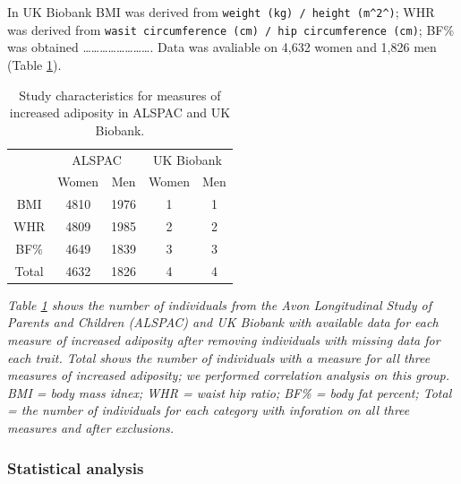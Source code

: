 \documentclass[11pt,twoside]{bristolthesis}
\begin{document}
In UK Biobank BMI was derived from \texttt{weight\ (kg)\ /\ height\ (m\^{}2\^{})}; WHR was derived from \texttt{wasit\ circumference\ (cm)\ /\ hip\ circumference\ (cm)}; BF\% was obtained \ldots{}\ldots{}\ldots{}\ldots{}\ldots{}\ldots{}\ldots{}\ldots{}. Data was avaliable on 4,632 women and 1,826 men (Table \ref{tab:study-characteristics}).
\begin{longtable}[t]{ccccc}
\caption{\label{tab:study-characteristics}Study characteristics for measures of increased adiposity in ALSPAC and UK Biobank.}\\
\toprule
\multicolumn{1}{c}{ } & \multicolumn{2}{c}{ALSPAC} & \multicolumn{2}{c}{UK Biobank} \\
\cmidrule(l{3pt}r{3pt}){2-3} \cmidrule(l{3pt}r{3pt}){4-5}
 & Women & Men & Women & Men\\
\midrule
BMI & 4810 & 1976 & 1 & 1\\
WHR & 4809 & 1985 & 2 & 2\\
BF\% & 4649 & 1839 & 3 & 3\\
Total & 4632 & 1826 & 4 & 4\\
\bottomrule
\end{longtable}
\noindent
\emph{Table \ref{tab:study-characteristics} shows the number of individuals from the Avon Longitudinal Study of Parents and Children (ALSPAC) and UK Biobank with available data for each measure of increased adiposity after removing individuals with missing data for each trait. Total shows the number of individuals with a measure for all three measures of increased adiposity; we performed correlation analysis on this group. BMI = body mass idnex; WHR = waist hip ratio; BF\% = body fat percent; Total = the number of individuals for each category with inforation on all three measures and after exclusions.}

\hypertarget{statistical-analysis}{%
\subsubsection{Statistical analysis}\label{statistical-analysis}}
\end{document}
